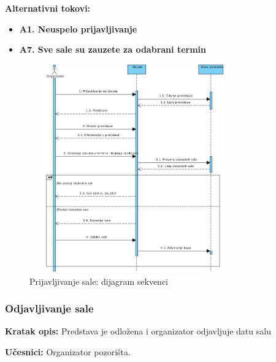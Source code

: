 \documentclass[a4paper]{article}
\begin{document}
\noindent\textbf{Alternativni tokovi:} 
\begin{itemize}
 \item \textbf{A1. Neuspelo prijavljivanje} 
  \item \textbf{A7. Sve sale su zauzete za odabrani termin} 
\end{itemize}
\begin{figure}[H]
  \begin{center}
      \includegraphics[width=90mm,height=90mm]{../images/sequence_prijavljivanje_sale.jpg}
  \end{center}
  \caption{Prijavljivanje sale: dijagram sekvenci}
  \label{sequence_prijavljivanje_sale}
\end{figure}
\subsubsection{Odjavljivanje sale}
\noindent\textbf{Kratak opis:} Predstava je odložena i organizator odjavljuje datu salu

\noindent\textbf{Učesnici:} Organizator pozorišta.
\end{document}

